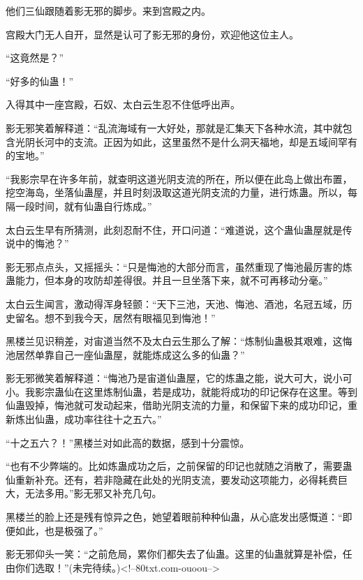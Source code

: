 \begin{this_body}
他们三仙跟随着影无邪的脚步。来到宫殿之内。

宫殿大门无人自开，显然是认可了影无邪的身份，欢迎他这位主人。

“这竟然是？”

“好多的仙蛊！”

入得其中一座宫殿，石奴、太白云生忍不住低呼出声。

影无邪笑着解释道：“乱流海域有一大好处，那就是汇集天下各种水流，其中就包含光阴长河中的支流。正因为如此，这里虽然不是什么洞天福地，却是五域间罕有的宝地。”

“我影宗早在许多年前，就查明这道光阴支流的所在，所以便在此岛上做出布置，挖空海岛，坐落仙蛊屋，并且时刻汲取这道光阴支流的力量，进行炼蛊。所以，每隔一段时间，就有仙蛊自行炼成。”

太白云生早有所猜测，此刻忍耐不住，开口问道：“难道说，这个蛊仙蛊屋就是传说中的悔池？”

影无邪点点头，又摇摇头：“只是悔池的大部分而言，虽然重现了悔池最厉害的炼蛊能力，但本身的攻防却差得很。并且一旦坐落下来，就不可再移动分毫。”

太白云生闻言，激动得浑身轻颤：“天下三池，天池、悔池、酒池，名冠五域，历史留名。想不到我今天，居然有眼福见到悔池！”

黑楼兰见识稍差，对宙道当然不及太白云生那么了解：“炼制仙蛊极其艰难，这悔池居然单靠自己一座仙蛊屋，就能炼成这么多的仙蛊？”

影无邪微笑着解释道：“悔池乃是宙道仙蛊屋，它的炼蛊之能，说大可大，说小可小。我影宗蛊仙在这里炼制仙蛊，若是成功，就能将成功的印记保存在这里。等到仙蛊毁掉，悔池就可发动起来，借助光阴支流的力量，和保留下来的成功印记，重新炼出仙蛊，成功率往往十之五六。”

“十之五六？！”黑楼兰对如此高的数据，感到十分震惊。

“也有不少弊端的。比如炼蛊成功之后，之前保留的印记也就随之消散了，需要蛊仙重新补充。还有，若非隐藏在此处的光阴支流，要发动这项能力，必得耗费巨大，无法多用。”影无邪又补充几句。

黑楼兰的脸上还是残有惊异之色，她望着眼前种种仙蛊，从心底发出感慨道：“即便如此，也是极强了。”

影无邪仰头一笑：“之前危局，累你们都失去了仙蛊。这里的仙蛊就算是补偿，任由你们选取！”(未完待续。)<!--80txt.com-ouoou-->

\end{this_body}

